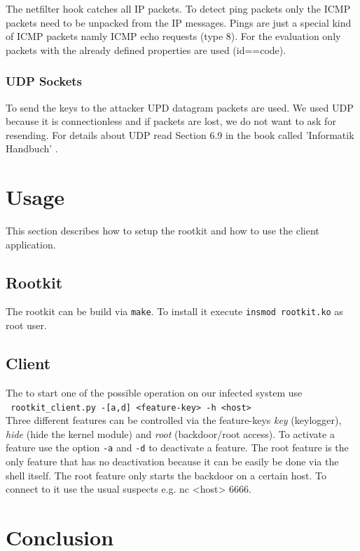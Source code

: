 \documentclass[12pt]{article}
\newcommand{\shellcmd}[1]{\\\indent\indent\texttt{\footnotesize\ #1}\\}
\newcommand{\shellcmdinline}[1]{\texttt{\footnotesize #1}}
\begin{document}
The netfilter hook catches all IP packets. To detect ping packets only the ICMP packets need to be unpacked from the IP messages. Pings are just a special kind of ICMP packets namly ICMP echo requests (type 8).  For the evaluation only packets with the already defined properties are used (id==code).

\subsubsection{UDP Sockets}
To send the keys to the attacker UPD datagram packets are used. We used UDP because it is connectionless and if packets are lost, we do not want to ask for resending. For details about UDP read Section 6.9 in the book called 'Informatik Handbuch' \cite{rechenberg1997informatik}.

\newpage
\section{Usage}
\label{sec:usage}
This section describes how to setup the rootkit and how to use the client application.

\subsection{Rootkit}
The rootkit can be build via \shellcmdinline{make}. To install it execute \shellcmdinline{insmod rootkit.ko} as root user.

\subsection{Client}
The to start one of the possible operation on our infected system use \shellcmd{rootkit\_client.py~-[a,d]~<feature-key>~-h~<host>} Three different features can be controlled via the feature-keys \emph{key} (keylogger), \emph{hide} (hide the kernel module) and \emph{root} (backdoor/root access). To activate a feature use the option \shellcmdinline{-a} and \shellcmdinline{-d} to deactivate a feature. The root feature is the only feature that has no deactivation because it can be easily be done via the shell itself. The root feature only starts the backdoor on a certain host. To connect to it use the usual suspects e.g. \shellcmdinline\shellcmdinline{nc <host> 6666}.

\newpage
\section{Conclusion}
\end{document}

